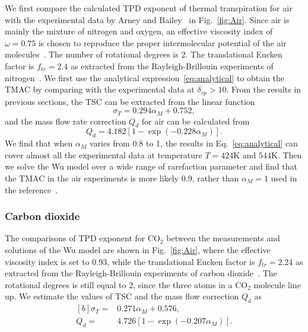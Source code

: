 We first compare the calculated TPD exponent of thermal transpiration for air with the experimental data by Arney and Bailey~\cite{arney1962addendum} in Fig.~\ref{fig:Air}. Since air is mainly the mixture of nitrogen and oxygen, an effective viscosity index of $\omega=0.75$ is chosen to reproduce the proper intermolecular potential of the air molecules~\citep{Bird1994,SU2019573}. %
The number of rotational degrees is $2$. The translational Eucken factor is $f_{tr}=2.4$ as extracted from the Rayleigh-Brillouin experiments of nitrogen~\citep{Wu2020JFM}. We first use the analytical expression~\eqref{eq:analytical} to obtain the TMAC by comparing with the experimental data at $\delta_{rp}>10$.  From the results in previous sections, the TSC can be extracted from the linear function 
\begin{equation}\label{eq:tsc_df}
\sigma_T=0.294\alpha_M+ 0.752,
\end{equation} 
and the mass flow rate correction $Q_d$ for air can be calculated from 
\begin{equation}\label{eq:air}
Q_d=4.182\left[1-\exp(-0.228 \alpha_M)\right].
\end{equation}
We find that when $\alpha_M$ varies from 0.8 to 1, the results in Eq.~\eqref{eq:analytical} can cover almost all the experimental data at temperature $T=424$K and $544$K. Then we solve the Wu model over a wide range of rarefaction parameter and find that the TMAC in the air experiments is more likely $0.9$, rather than $\alpha_M=1$ used in the reference~\cite{loyalka1982thermal}.



\subsubsection{Carbon dioxide}






The comparisons of TPD exponent for CO$_2$ between the measurements and solutions of the Wu model are shown in Fig.~\ref{fig:Air}, where the effective viscosity index is set to 0.93, while the translational Eucken factor is $f_{tr}=2.24$ as extracted from the Rayleigh-Brillouin experiments of carbon dioxide~\citep{Wu2020JFM}. The rotational degrees is still equal to 2, since the three atoms in a CO$_2$ molecule line up. We estimate the values of TSC and the mass flow correction $Q_d$ as
\begin{equation}
\begin{aligned}[b]
\sigma_T=&0.271\alpha_M+ 0.576,\\
Q_d=&4.726\left[1-\exp(-0.207 \alpha_M)\right].
\end{aligned}
\end{equation} 


